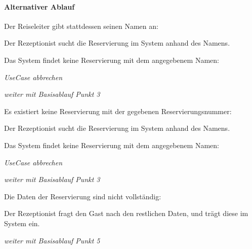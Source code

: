 \paragraph{Alternativer Ablauf}
\begin{longenum}
	\item
	\begin{longenum}
		\item Der Reiseleiter gibt stattdessen seinen Namen an:
		\item Der \Gls{Rezeptionist} sucht die \Gls{Reservierung} im System anhand des Namens.
		\begin{longenum}
			\item Das System findet keine \Gls{Reservierung} mit dem angegebenem Namen:
			\begin{longenum}
				\item \emph{UseCase abbrechen}
			\end{longenum}
		\end{longenum}
		\item \emph{weiter mit Basisablauf Punkt 3}
	\end{longenum}
	\item
	\begin{longenum}
		\item Es existiert keine \Gls{Reservierung} mit der gegebenen \Gls{Reservierungsnummer}:
		\item Der \Gls{Rezeptionist} sucht die \Gls{Reservierung} im System anhand des Namens.
		\begin{longenum}
			\item Das System findet keine \Gls{Reservierung} mit dem angegebenem Namen:
			\begin{longenum}
				\item \emph{UseCase abbrechen}
			\end{longenum}
		\end{longenum}
		\item \emph{weiter mit Basisablauf Punkt 3}
	\end{longenum}
	\item
	\item
	\begin{longenum}
		\item Die Daten der \Gls{Reservierung} sind nicht vollständig:
		\begin{longenum}
			\item Der \Gls{Rezeptionist} fragt den \Gls{Gast} nach den restlichen Daten, und trägt diese im System ein.
			\item \emph{weiter mit Basisablauf Punkt 5}
		\end{longenum}
	\end{longenum}
	\item
	\item
	\item
\end{longenum}

